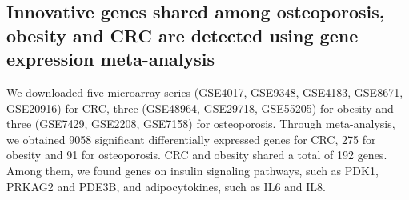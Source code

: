 \subsection{Innovative genes shared among osteoporosis, obesity and CRC are detected using gene expression meta-analysis}

We downloaded five microarray series (GSE4017, GSE9348, GSE4183, GSE8671, GSE20916) for CRC, three (GSE48964, GSE29718, GSE55205) for obesity and three (GSE7429, GSE2208, GSE7158) for osteoporosis. Through meta-analysis, we obtained 9058 significant differentially expressed genes for CRC, 275 for obesity and 91 for osteoporosis. CRC and obesity shared a total of 192 genes. Among them, we found genes on insulin signaling pathways, such as PDK1, PRKAG2 and PDE3B, and adipocytokines, such as IL6 and IL8.

